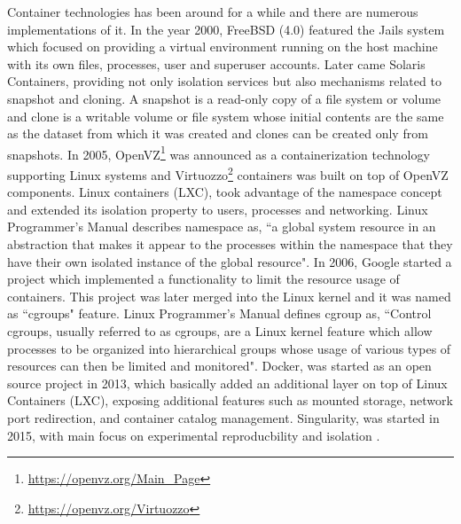 Container technologies has been around for a while and there are numerous implementations of it. In the year 2000, FreeBSD (4.0) featured the Jails system which focused on providing a virtual environment running on the host machine with its own files, processes, user and superuser accounts. Later came Solaris Containers, providing not only isolation services but also mechanisms related to snapshot and cloning. A snapshot is a read-only copy of a file system or volume and clone is a writable volume or file system whose initial contents are the same as the dataset from which it was created and clones can be created only from snapshots. In 2005, OpenVZ\footnote{\url{https://openvz.org/Main_Page}} was announced as a containerization technology supporting Linux systems and Virtuozzo\footnote{\url{https://openvz.org/Virtuozzo}} containers was built on top of OpenVZ components. Linux containers (LXC), took advantage of the namespace concept and extended its isolation property to users, processes and networking. Linux Programmer's Manual \cite{namespaces} describes namespace as, ``a global system resource in an abstraction that makes it appear to the processes within the namespace that they have their own isolated instance of the global resource". In 2006, Google started a project which implemented a functionality to limit the resource usage of containers. This project was later merged into the Linux kernel and it was named as ``cgroups" feature. Linux Programmer's Manual \cite{cgroups} defines cgroup as, ``Control cgroups, usually referred to as cgroups, are a Linux kernel feature which allow processes to be organized into hierarchical groups whose usage of various types of resources can then be limited and monitored". Docker, was started as an open source project in 2013, which basically added an additional layer on top of Linux Containers (LXC), exposing additional features such as mounted storage, network port redirection, and container catalog management. Singularity, was started in 2015, with main focus on experimental reproducbility and isolation \cite{Xavier:2013:PEC:2497369.2497577}.

